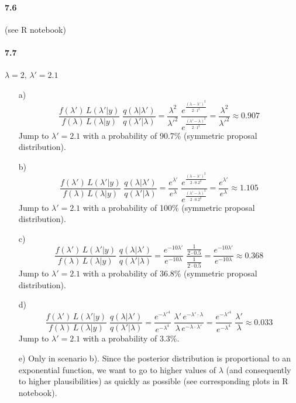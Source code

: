 \documentclass[fontsize=11pt,DIV=18,parskip=half]{scrartcl}
\begin{document}
\paragraph{7.6} (see R notebook)

\paragraph{7.7} $\lambda=2, \, \lambda'=2.1$

\begin{enumerate}
\item[a)] $$\frac{f(\lambda') \, L(\lambda'|y)}{f(\lambda) \, L(\lambda|y) } \; \frac{q(\lambda|\lambda')}{q(\lambda'|\lambda)} = \frac{\lambda^{2}}{\lambda'^{2}} \; \frac{e^{\frac{(\lambda-\lambda')^2}{2 \cdot 1^2}}}{e^{\frac{(\lambda'-\lambda)^2}{2 \cdot 1^2}}} = \frac{\lambda^{2}}{\lambda'^{2}} \approx 0.907 $$
Jump to $\lambda'=2.1$ with a probability of 90.7\% (symmetric proposal distribution).

\item[b)] $$\frac{f(\lambda') \, L(\lambda'|y)}{f(\lambda) \, L(\lambda|y) } \; \frac{q(\lambda|\lambda')}{q(\lambda'|\lambda)} = \frac{e^{\lambda'}}{e^\lambda} \; \frac{e^{\frac{(\lambda-\lambda')^2}{2 \cdot 0.2^2}}}{e^{\frac{(\lambda'-\lambda)^2}{2 \cdot 0.2^2}}} = \frac{e^{\lambda'}}{e^\lambda} \approx 1.105 $$
Jump to $\lambda'=2.1$ with a probability of 100\% (symmetric proposal distribution).

\item[c)] $$\frac{f(\lambda') \, L(\lambda'|y)}{f(\lambda) \, L(\lambda|y) } \; \frac{q(\lambda|\lambda')}{q(\lambda'|\lambda)} = \frac{e^{-10 \lambda'}}{e^{-10 \lambda}} \; \frac{\frac{1}{2\cdot0.5}}{\frac{1}{2\cdot0.5}} = \frac{e^{-10\lambda'}}{e^{-10\lambda}} \approx 0.368 $$
Jump to $\lambda'=2.1$ with a probability of 36.8\% (symmetric proposal distribution).

\item[d)] $$\frac{f(\lambda') \, L(\lambda'|y)}{f(\lambda) \, L(\lambda|y) } \; \frac{q(\lambda|\lambda')}{q(\lambda'|\lambda)} = \frac{e^{-\lambda'^4}}{e^{-\lambda^4}} \; \frac{\lambda' \, e^{-\lambda' \cdot \lambda}}{\lambda \, e^{-\lambda \cdot \lambda'}} = \frac{e^{-\lambda'^4}}{e^{-\lambda^4}} \; \frac{\lambda'}{\lambda} \approx 0.033 $$
Jump to $\lambda'=2.1$ with a probability of 3.3\%.

\item[e)] Only in scenario b). Since the posterior distribution is proportional to an exponential function, we want to go to higher values of $\lambda$ (and consequently to higher plausibilities) as quickly as possible (see corresponding plots in R notebook).
\end{enumerate}
\end{document}
